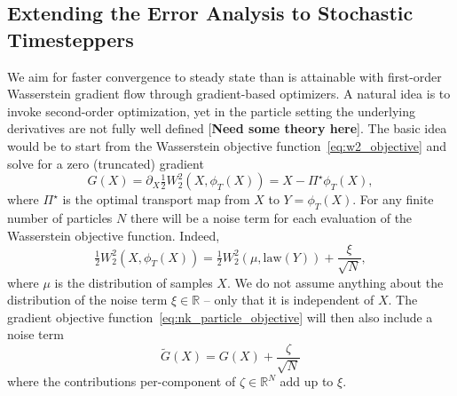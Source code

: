 \documentclass{article}
\begin{document}
\subsection{Extending the Error Analysis to Stochastic Timesteppers} \label{subsec:nk_noisy}
We aim for faster convergence to steady state than is attainable with first-order Wasserstein gradient flow through gradient-based optimizers. A natural idea is to invoke second-order optimization, yet in the particle setting the underlying derivatives are not fully well defined [\textbf{Need some theory here}]. The basic idea would be to start from the Wasserstein objective function~\eqref{eq:w2_objective} and solve for a zero (truncated) gradient 
\begin{equation} \label{eq:nk_particle_objective}
    G(X) = \partial_X \tfrac{1}{2} W_2^2\left(X, \phi_T(X)\right) = X - \Pi^\star \phi_T(X),
\end{equation}
where $\Pi^\star$ is the optimal transport map from $X$ to $Y = \phi_T(X)$. For any finite number of particles $N$ there will be a noise term for each evaluation of the Wasserstein objective function. Indeed,
\begin{equation}
    \tfrac{1}{2} W_2^2(X, \phi_T(X)) = \tfrac{1}{2}W_2^2(\mu, \text{law}(Y)) + \frac{\xi}{\sqrt{N}},
\end{equation}
where $\mu$ is the distribution of samples $X$. We do not assume anything about the distribution of the noise term $\xi \in \mathbb{R}$ -- only that it is independent of $X$. The gradient objective function~\eqref{eq:nk_particle_objective} will then also include a noise term
\begin{equation} \label{eq:nk_particle_objective_noise}
    \tilde{G}(X) = G(X) + \frac{\zeta}{\sqrt{N}}
\end{equation}
where the contributions per-component of $\zeta \in \mathbb{R}^N$ add up to $\xi$.
\end{document}
